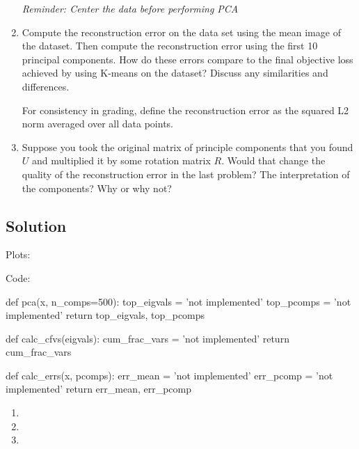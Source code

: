 \documentclass[submit]{harvardml}
\begin{document}
\begin{problem}
\begin{enumerate}
  \textit{Reminder: Center the data before performing PCA}

\item Compute the reconstruction error on the data set using the mean
  image of the dataset.  Then compute the reconstruction error using
  the first 10 principal components.  How do these errors compare to
  the final objective loss achieved by using K-means on the dataset?
  Discuss any similarities and differences.

  For consistency in grading, define the reconstruction error as the squared L2
  norm averaged over all data points.

\item Suppose you took the original matrix of principle components
  that you found $U$ and multiplied it by some rotation matrix $R$.
  Would that change the quality of the reconstruction error in the
  last problem?  The interpretation of the components?  Why or why
  not?
  
\end{enumerate}


\end{problem}

\newpage
\subsection*{Solution}
Plots:



Code:

\begin{python}
def pca(x, n_comps=500):
    top_eigvals = 'not implemented'
    top_pcomps = 'not implemented'
    return top_eigvals, top_pcomps


def calc_cfvs(eigvals):
    cum_frac_vars = 'not implemented'
    return cum_frac_vars


def calc_errs(x, pcomps):
    err_mean = 'not implemented'
    err_pcomp = 'not implemented'
    return err_mean, err_pcomp
\end{python}

\begin{enumerate}
  \item 
  \item 
  \item 
\end{enumerate}
\end{document}

